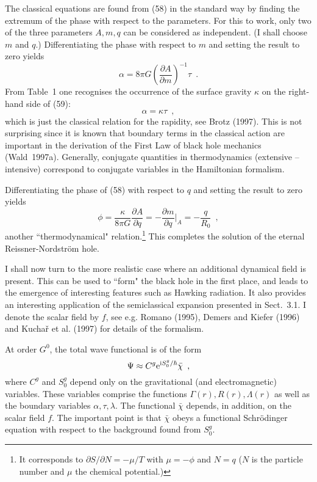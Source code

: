 \documentclass[12pt]{article}
\def\E{{\rm e}}
\def\I{{\rm i}}
\newcommand{\be}{\begin{equation}}
\newcommand{\ee}{\end{equation}}
\begin{document}
The classical equations are found from (58) in the standard way by
finding the extremum of the phase with respect to the parameters.
For this to work, only two of the three parameters $A,m,q$
can be considered as independent. (I shall choose $m$ and $q$.)
Differentiating the phase with respect to $m$ and setting the result to zero
yields
\be \alpha= 8\pi G\left(\frac{\partial A}{\partial m}\right)^{-1}
    \tau \enspace . \ee
{}From Table~1 one recognises the occurrence of the surface gravity
$\kappa$ on the right-hand side of (59):
\be \alpha=\kappa\tau \enspace , \ee
which is just the classical relation for the rapidity, see Brotz (1997).
This is not surprising since it is known that boundary terms
in the classical action are important in the derivation of
the First Law of black hole mechanics (Wald~1997a).
Generally, conjugate quantities in thermodynamics (extensive --
intensive) correspond to conjugate variables in the Hamiltonian
formalism.

Differentiating the phase of (58) with respect to $q$
and setting the result to zero
yields
\be \phi=\frac{\kappa}{8\pi G}\frac{\partial A}{\partial q}
        =-\frac{\partial m}{\partial q}\vert_A =-\frac{q}{R_0}
    \enspace , \ee
another ``thermodynamical" relation.\footnote{It corresponds to
$\partial S/\partial N=-\mu/T$ with $\mu=-\phi$ and
$N=q$ ($N$ is the particle number and $\mu$ the chemical potential.)}
This completes the solution of the eternal Reissner-Nordstr\"om
hole. 

I shall now turn to the more realistic case where an additional
dynamical field is present. This can be used to ``form" the black hole
in the first place, and leads to the emergence of 
interesting features such as Hawking radiation. It also provides 
an interesting application of the semiclassical expansion
presented in Sect.~3.1. I denote the scalar field  by $f$, see e.g.
Romano (1995), Demers and Kiefer (1996)
 and Kucha\v{r} et al. (1997) for details of the formalism.

At order $G^0$, the total wave functional is of the form
\be \Psi\approx C^g\E^{\I S_0^g/\hbar}\bar{\chi}\enspace , \ee
where $C^g$ and $S_0^g$ depend only on the gravitational
(and electromagnetic) variables. These variables comprise
the functions $\Gamma(r), R(r), \Lambda(r)$ as well as the
boundary variables $\alpha,\tau,\lambda$. The functional $\bar{\chi}$
depends, in addition, on the scalar field $f$. The important point
is that $\bar{\chi}$ obeys a functional Schr\"odinger equation
with respect to the background found from $S_0^g$.
\end{document}
